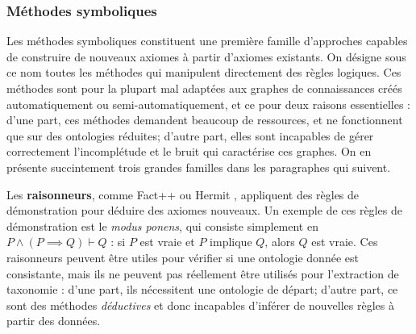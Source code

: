 \subsubsection{Méthodes symboliques}

Les méthodes symboliques constituent une première famille d'approches capables de construire de nouveaux axiomes à partir d'axiomes existants. On désigne sous ce nom toutes les méthodes qui manipulent directement des règles logiques.
Ces méthodes sont pour la plupart mal adaptées aux graphes de connaissances créés automatiquement ou semi-automatiquement, et ce pour deux raisons essentielles : d'une part, ces méthodes demandent beaucoup de ressources, et ne fonctionnent que sur des ontologies réduites; d'autre part, elles sont incapables de gérer correctement l'incomplétude et le bruit qui caractérise ces graphes.  On en présente succintement trois grandes familles dans les paragraphes qui suivent.

Les \textbf{raisonneurs}, comme Fact++ \cite{tsarkov2006fact++} ou Hermit \cite{glimm2014hermit}, appliquent des règles de démonstration pour déduire des axiomes nouveaux. Un exemple de ces règles de démonstration est le \textit{modus ponens}, qui consiste simplement en $P \land (P \implies Q) \vdash Q$ : si $P$ est vraie et $P$ implique $Q$, alors $Q$ est vraie. Ces raisonneurs peuvent être utiles pour vérifier si une ontologie donnée est consistante, mais ils ne peuvent pas réellement être utilisés pour l'extraction de taxonomie : 
d'une part, ils nécessitent une ontologie de départ; d'autre part, ce sont des méthodes \textit{déductives} et donc incapables d'inférer de nouvelles règles à partir des données. %

